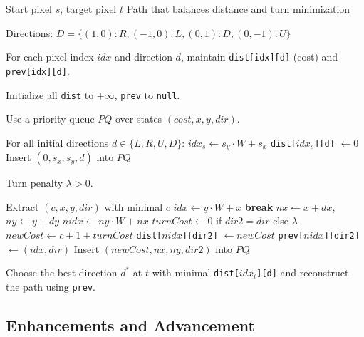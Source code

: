 \documentclass[11pt]{article}
\begin{document}
\begin{algorithm}[h!]
\caption{Directional BFS with Turn Penalty}
\begin{algorithmic}[1]
\Require Start pixel $s$, target pixel $t$
\Ensure Path that balances distance and turn minimization

\State Directions:
\State \hspace{1em} $D = \{(1,0):R, (-1,0):L, (0,1):D, (0,-1):U\}$

\State For each pixel index $idx$ and direction $d$, maintain
\texttt{dist[idx][d]} (cost) and \texttt{prev[idx][d]}.

\State Initialize all \texttt{dist} to $+\infty$, \texttt{prev} to
\texttt{null}.

\State Use a priority queue $PQ$ over states $(cost,x,y,dir)$.

\State For all initial directions $d \in \{L,R,U,D\}$:
\State \hspace{1em} $idx_s \gets s_y \cdot W + s_x$
\State \hspace{1em} \texttt{dist[$idx_s$][d]} $\gets 0$
\State \hspace{1em} Insert $(0,s_x,s_y,d)$ into $PQ$

\State Turn penalty $\lambda > 0$.

  \State Extract $(c,x,y,dir)$ with minimal $c$
  \State $idx \gets y \cdot W + x$
    \State \textbf{break}
  \EndIf
    \State $nx \gets x + dx$, $ny \gets y + dy$
      \State $nidx \gets ny \cdot W + nx$
      \State $turnCost \gets 0$ if $dir2 = dir$ else $\lambda$
      \State $newCost \gets c + 1 + turnCost$
        \State \texttt{dist[$nidx$][dir2]} $\gets newCost$
        \State \texttt{prev[$nidx$][dir2]} $\gets (idx,dir)$
        \State Insert $(newCost,nx,ny,dir2)$ into $PQ$
      \EndIf
    \EndIf
  \EndFor
\EndWhile

\State Choose the best direction $d^\ast$ at $t$ with minimal
\texttt{dist[$idx_t$][d]} and reconstruct the path using \texttt{prev}.
\end{algorithmic}
\end{algorithm}

\subsection{Enhancements and Advancement}
\end{document}
